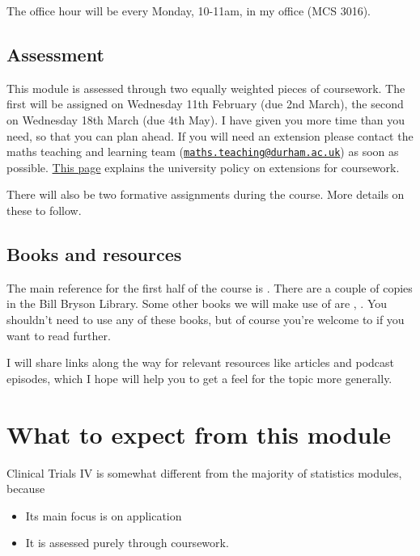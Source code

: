 \documentclass[
  openany]{book}
\providecommand{\tightlist}{%
  \setlength{\itemsep}{0pt}\setlength{\parskip}{0pt}}
\theoremstyle{definition}
\theoremstyle{definition}
\theoremstyle{definition}
\theoremstyle{definition}
\theoremstyle{remark}
\begin{document}
The office hour will be every Monday, 10-11am, in my office (MCS 3016).

\subsection*{Assessment}\label{assessment}

This module is assessed through two equally weighted pieces of coursework. The first will be assigned on Wednesday 11th February (due 2nd March), the second on Wednesday 18th March (due 4th May). I have given you more time than you need, so that you can plan ahead. If you will need an extension please contact the maths teaching and learning team (\href{mailto:maths.teaching@durham.ac.uk}{\nolinkurl{maths.teaching@durham.ac.uk}}) as soon as possible. \href{https://durhamuniversity.sharepoint.com/teams/extensionsselfcertification/extensions}{This page} explains the university policy on extensions for coursework.

There will also be two formative assignments during the course. More details on these to follow.

\subsection*{Books and resources}\label{books-and-resources}

The main reference for the first half of the course is \citet{matthews2006introduction}. There are a couple of copies in the Bill Bryson Library. Some other books we will make use of are \citet{hulley2013designing}, \citet{hayes2017cluster}. You shouldn't need to use any of these books, but of course you're welcome to if you want to read further.

I will share links along the way for relevant resources like articles and podcast episodes, which I hope will help you to get a feel for the topic more generally.

\section*{What to expect from this module}\label{what-to-expect-from-this-module}

Clinical Trials IV is somewhat different from the majority of statistics modules, because

\begin{itemize}
\tightlist
\item
  Its main focus is on application
\item
  It is assessed purely through coursework.
\end{itemize}
\end{document}
